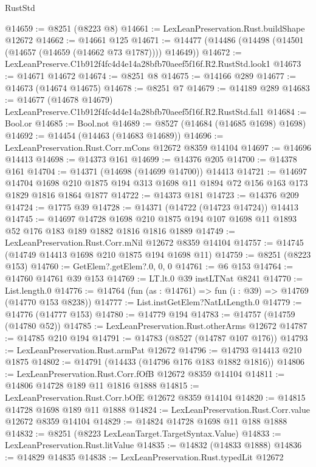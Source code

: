 \begin{lexlean}{RustStd}
\begin{coremodule}
@14659 := @8251 (@8223 @8)
@14661 := LexLeanPreservation.Rust.buildShape @12672
@14662 := @14661 @125
@14671 := @14477 (@14486 (@14498 (@14501 (@14657 (@14659 (@14662 @73 @1787)))) @14649))
@14672 := LexLeanPreserve.C1b912f4fc4d4e14a28bfb70aeef5f16f.R2.RustStd.look1
@14673 := @14671 @14672
@14674 := @8251 @8
@14675 := @14166 @289
@14677 := @14673 (@14674 @14675)
@14678 := @8251 @7
@14679 := @14189 @289
@14683 := @14677 (@14678 @14679) LexLeanPreserve.C1b912f4fc4d4e14a28bfb70aeef5f16f.R2.RustStd.fal1
@14684 := Bool.or
@14685 := Bool.not
@14689 := @8527 (@14684 (@14685 @1698) @1698)
@14692 := @14454 (@14463 (@14683 @14689))
@14696 := LexLeanPreservation.Rust.Corr.mCons @12672 @8359 @14104
@14697 := @14696 @14413
@14698 := @14373 @161
@14699 := @14376 @205
@14700 := @14378 @161
@14704 := @14371 (@14698 (@14699 @14700)) @14413
@14721 := @14697
    @14704
    @1698
    @210
    @1875
    @194
    @313
    @1698
    @11
    @1894
    @72
    @156
    @163
    @173
    @1829
    @1816
    @1864
    @1877
@14722 := @14373 @181
@14723 := @14376 @209
@14724 := @1775 @39
@14728 := @14371 (@14722 (@14723 @14724)) @14413
@14745 := @14697
    @14728
    @1698
    @210
    @1875
    @194
    @107
    @1698
    @11
    @1893
    @52
    @176
    @183
    @189
    @1882
    @1816
    @1816
    @1889
@14749 := LexLeanPreservation.Rust.Corr.mNil @12672 @8359 @14104
@14757 := @14745 (@14749 @14413 @1698 @210 @1875 @194 @1698 @11)
@14759 := @8251 (@8223 @153)
@14760 := GetElem?.getElem?.{0, 0, 0}
@14761 := @6 @153
@14764 := @14760 @14761 @39 @153
@14769 := LT.lt.{0} @39 instLTNat @8241
@14770 := List.length.{0}
@14776 := @14764 (fun (as : @14761) => fun (i : @39) => @14769 (@14770 @153 @8238))
@14777 := List.instGetElem?NatLtLength.{0}
@14779 := @14776 (@14777 @153)
@14780 := @14779 @194
@14783 := @14757 (@14759 (@14780 @52))
@14785 := LexLeanPreservation.Rust.otherArms @12672
@14787 := @14785 @210 @194
@14791 := @14783 (@8527 (@14787 @107 @176))
@14793 := LexLeanPreservation.Rust.armPat @12672
@14796 := @14793 @14413 @210 @1875
@14802 := @14791 (@14433 (@14796 @176 @183 @1882 @1816))
@14806 := LexLeanPreservation.Rust.Corr.fOfB @12672 @8359 @14104
@14811 := @14806 @14728 @189 @11 @1816 @1888
@14815 := LexLeanPreservation.Rust.Corr.bOfE @12672 @8359 @14104
@14820 := @14815 @14728 @1698 @189 @11 @1888
@14824 := LexLeanPreservation.Rust.Corr.value @12672 @8359 @14104
@14829 := @14824 @14728 @1698 @11 @188 @1888
@14832 := @8251 (@8223 LexLeanTarget.TargetSyntax.Value)
@14833 := LexLeanPreservation.Rust.litValue
@14835 := @14832 (@14833 @1888)
@14836 := @14829 @14835
@14838 := LexLeanPreservation.Rust.typedLit @12672

\end{coremodule}
\end{lexlean}
